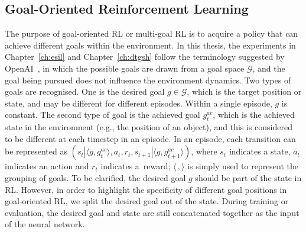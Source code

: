 \subsection{Goal-Oriented Reinforcement Learning}
\label{ch3:goal_rl}
The purpose of goal-oriented RL or multi-goal RL is to acquire a policy that can achieve different goals within the environment. 
In this thesis, the experiments in Chapter~\ref{ch:esil} and Chapter~\ref{ch:dtgsh} follow the terminology suggested by OpenAI~\cite{plappert2018multi}, in which the possible goals are drawn from a goal space $\mathcal{G}$, and the goal being pursued does not influence the environment dynamics. Two types of goals are recognised. One is the desired goal $g\in \mathcal{G}$, which is the target position {or state}, and may be different for different episodes. Within a single episode, $g$ is constant.  The second type of goal is the achieved goal $g^{ac}_{t}$, which is the achieved state in the environment (e.g., the position of an object), and this is considered to be different at each timestep in an episode. In an episode, each transition can be represented as $(s_t|\langle g, g^{ac}_{t} \rangle, a_t, r_t, s_{t+1}|\langle g, g^{ac}_{t+1} \rangle)$, where $s_t$ indicates a state, $a_t$ indicates an action and $r_t$ indicates a~reward; $\langle \, , \rangle$ is simply used to represent the grouping of goals. To be clarified, the desired goal $g$ should be part of the state in RL. However, in order to highlight the specificity of different goal positions in goal-oriented RL, we split the desired goal out of the state. During training or evaluation, the desired goal and state are still concatenated together as the input of the neural network.

